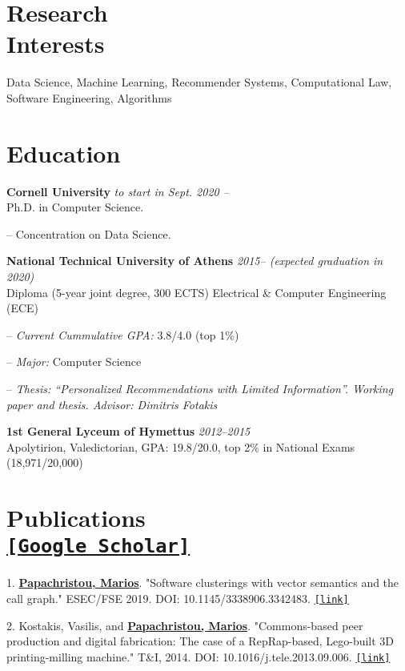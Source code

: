 \documentclass[margin, 10pt]{res}
\newcommand{\field}[2]{\noindent \textbf{#1} \hfill #2 \\}
\begin{document}
\begin{resume}

\section{Research \\ Interests} Data Science, Machine Learning, Recommender Systems, Computational Law, Software Engineering, Algorithms 

\section{Education}
\field {Cornell University} {\emph{to start in Sept. 2020 --}}
Ph.D. in Computer Science. 
\begin{compactitem}
\item[--] Concentration on Data Science.  
\end{compactitem} 
 
\field{National Technical University of Athens}  {\emph{2015-- (expected graduation in 2020)}} 
Diploma (5-year joint degree, 300 ECTS) Electrical \& Computer Engineering (ECE)
\begin{compactitem}
\item[--] \emph{Current Cummulative GPA:} 3.8/4.0 (top 1\%)
\item[--] \emph{Major:} Computer Science
\item[--] \emph{Thesis: ``Personalized Recommendations with Limited Information''. Working paper and thesis. Advisor: Dimitris Fotakis}
\end{compactitem} 
\field{1st General Lyceum of Hymettus} {\emph{2012--2015}} 
    Apolytirion, Valedictorian, GPA: 19.8/20.0, top 2\% in National Exams (18,971/20,000)


\section{Publications \\ \href{https://scholar.google.gr/citations?user=T12JO3MAAAAJ&hl=en}{\nolinkurl{[Google Scholar]}}}

\begin{compactitem}
    \item[1.] \underline{\textbf{Papachristou, Marios}}. "Software clusterings with vector semantics and the call graph." ESEC/FSE 2019. DOI: 10.1145/3338906.3342483. \href{https://dl.acm.org/citation.cfm?id=3342483}{\nolinkurl{[link]}}
    \item[2.] Kostakis, Vasilis, and \underline{\textbf{Papachristou, Marios}}. "Commons-based peer production and digital fabrication: The case of a RepRap-based, Lego-built 3D printing-milling machine." T\&I, 2014. DOI: 10.1016/j.tele.2013.09.006. \href{https://bit.ly/2JRoisV}{\nolinkurl{[link]}} \end{compactitem}



\end{resume}
\end{document}

